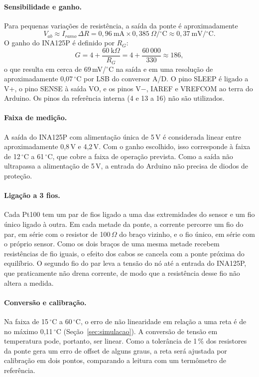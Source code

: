 \paragraph{Sensibilidade e ganho.} Para pequenas variações de resistência, a saída da ponte é aproximadamente
\begin{equation}
  V_{ab} \approx I_{ramo}\,\Delta R = 0{,}96\ \text{mA} \times 0{,}385\ \Omega/{}^\circ\text{C} \approx 0{,}37\ \text{mV}/{}^\circ\text{C}.
\end{equation}
O ganho do INA125P é definido por $R_G$:
\begin{equation}
  G = 4 + \frac{60\ \text{k}\Omega}{R_G} = 4 + \frac{60\,000}{330} \approx 186,
\end{equation}
o que resulta em cerca de 69\,mV/\ensuremath{^\circ}C na saída e em uma resolução de aproximadamente 0,07\,\ensuremath{^\circ}C por LSB do conversor A/D. O pino SLEEP é ligado a V+, o pino SENSE à saída VO, e os pinos V$-$, IAREF e VREFCOM ao terra do Arduino. Os pinos da referência interna (4 e 13 a 16) não são utilizados.

\paragraph{Faixa de medição.} A saída do INA125P com alimentação única de 5\,V é considerada linear entre aproximadamente 0,8\,V e 4,2\,V. Com o ganho escolhido, isso corresponde à faixa de 12\,\ensuremath{^\circ}C a 61\,\ensuremath{^\circ}C, que cobre a faixa de operação prevista. Como a saída não ultrapassa a alimentação de 5\,V, a entrada do Arduino não precisa de diodos de proteção.

\paragraph{Ligação a 3 fios.} Cada Pt100 tem um par de fios ligado a uma das extremidades do sensor e um fio único ligado à outra. Em cada metade da ponte, a corrente percorre um fio do par, em série com o resistor de 100\,$\Omega$ do braço vizinho, e o fio único, em série com o próprio sensor. Como os dois braços de uma mesma metade recebem resistências de fio iguais, o efeito dos cabos se cancela com a ponte próxima do equilíbrio. O segundo fio do par leva a tensão do nó até a entrada do INA125P, que praticamente não drena corrente, de modo que a resistência desse fio não altera a medida.

\paragraph{Conversão e calibração.} Na faixa de 15\,\ensuremath{^\circ}C a 60\,\ensuremath{^\circ}C, o erro de não linearidade em relação a uma reta é de no máximo 0,11\,\ensuremath{^\circ}C (Seção~\ref{sec:simulacao}). A conversão de tensão em temperatura pode, portanto, ser linear. Como a tolerância de 1\,\% dos resistores da ponte gera um erro de offset de alguns graus, a reta será ajustada por calibração em dois pontos, comparando a leitura com um termômetro de referência.

